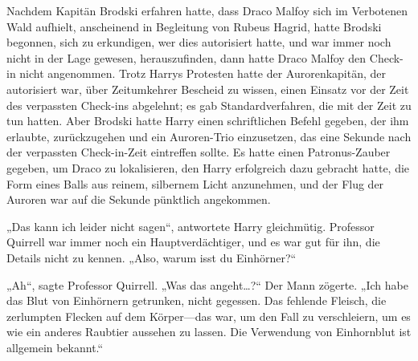 Nachdem Kapitän Brodski erfahren hatte, dass Draco Malfoy sich im Verbotenen Wald aufhielt, anscheinend in Begleitung von Rubeus Hagrid, hatte Brodski begonnen, sich zu erkundigen, wer dies autorisiert hatte, und war immer noch nicht in der Lage gewesen, herauszufinden, dann hatte Draco Malfoy den Check-in nicht angenommen. Trotz Harrys Protesten hatte der Aurorenkapitän, der autorisiert war, über Zeitumkehrer Bescheid zu wissen, einen Einsatz vor der Zeit des verpassten Check-ins abgelehnt; es gab Standardverfahren, die mit der Zeit zu tun hatten. Aber Brodski hatte Harry einen schriftlichen Befehl gegeben, der ihm erlaubte, zurückzugehen und ein Auroren-Trio einzusetzen, das eine Sekunde nach der verpassten Check-in-Zeit eintreffen sollte. Es hatte einen Patronus-Zauber gegeben, um Draco zu lokalisieren, den Harry erfolgreich dazu gebracht hatte, die Form eines Balls aus reinem, silbernem Licht anzunehmen, und der Flug der Auroren war auf die Sekunde pünktlich angekommen.

„Das kann ich leider nicht sagen“, antwortete Harry gleichmütig. Professor Quirrell war immer noch ein Hauptverdächtiger, und es war gut für ihn, die Details nicht zu kennen. „Also, warum isst du Einhörner?“

„Ah“, sagte Professor Quirrell. „Was das angeht…?“ Der Mann zögerte. „Ich habe das Blut von Einhörnern getrunken, nicht gegessen. Das fehlende Fleisch, die zerlumpten Flecken auf dem Körper—das war, um den Fall zu verschleiern, um es wie ein anderes Raubtier aussehen zu lassen. Die Verwendung von Einhornblut ist allgemein bekannt.“

